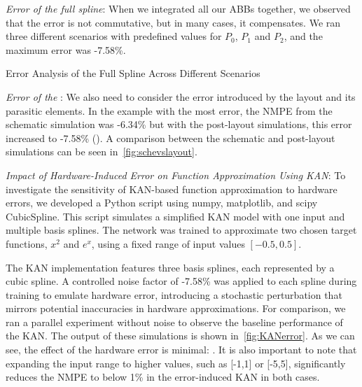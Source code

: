 \textit{Error of the full spline}: When we integrated all our ABBs together, we observed that the error is not commutative, but in many cases, it compensates. 
We ran three different scenarios with predefined values for $P_{0}$, $P_{1}$ and $P_{2}$, and the maximum error was -7.58\%.

\begin{table}
\centering
\caption{Error Analysis of the Full Spline Across Different Scenarios}
\scalebox{1}{}
\label{tab:errorFullSpline}
\end{table}



\textit{Error of the }: We also need to consider the error introduced by the layout and its parasitic elements. 
In the example with the most error, the NMPE from the schematic simulation was -6.34\% but with the post-layout simulations, this error increased to -7.58\% (). 
A comparison between the schematic and post-layout simulations can be seen in~\autoref{fig:schevslayout}.



\textit{Impact of Hardware-Induced Error on Function Approximation Using KAN}: To investigate the sensitivity of KAN-based function approximation to hardware errors, we developed a Python script using numpy, matplotlib, and scipy CubicSpline. 
This script simulates a simplified KAN model with one input and multiple basis splines. 
The network was trained to approximate two chosen target functions, $x^2$ and $e^x$, using a fixed range of input values $[-0.5,0.5]$.

The KAN implementation features three basis splines, each represented by a cubic spline. 
A controlled noise factor of -7.58\% was applied to each spline during training to emulate hardware error, introducing a stochastic perturbation that mirrors potential inaccuracies in hardware approximations. 
For comparison, we ran a parallel experiment without noise to observe the baseline performance of the KAN.
The output of these simulations is shown in~\autoref{fig:KANerror}. As we can see, the effect of the hardware error is minimal: .
It is also important to note that expanding the input range to higher values, such as [-1,1] or [-5,5], significantly reduces the NMPE to below 1\% in the error-induced KAN in both cases.

